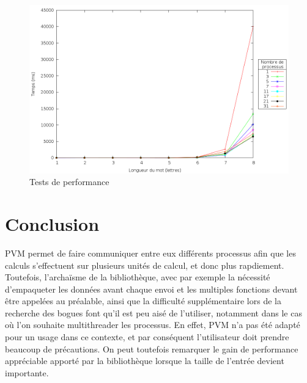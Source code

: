\documentclass[a4paper,11pt]{article}
\begin{document}
\begin{figure}[h!]
  \centering
  \includegraphics[width=\textwidth]{plot.png}
  \caption{Tests de performance}
  \label{perf}
\end{figure}

\section{Conclusion}

PVM permet de faire communiquer entre eux différents processus afin que les calculs s'effectuent sur plusieurs unités de calcul, et donc plus rapdiement. Toutefois, l'archaïsme de la bibliothèque, avec par exemple la nécessité d'empaqueter les données avant chaque envoi et les multiples fonctions devant être appelées au préalable, ainsi que la difficulté supplémentaire lors de la recherche des bogues font qu'il est peu aisé de l'utiliser, notamment dans le cas où l'on souhaite multithreader les processus. En effet, PVM n'a pas été adapté pour un usage dans ce contexte, et par conséquent l'utilisateur doit prendre beaucoup de précautions. On peut toutefois remarquer le gain de performance appréciable apporté par la bibliothèque lorsque la taille de l'entrée devient importante. 
\end{document}
